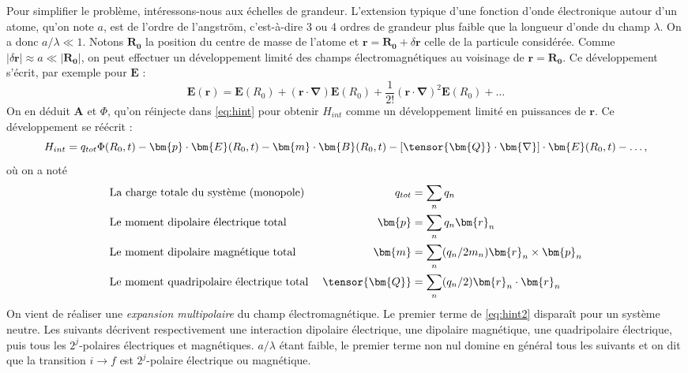 Pour simplifier le problème, intéressons-nous aux échelles de grandeur. L'extension typique d'une fonction d'onde électronique autour d'un atome, qu'on note $a$, est de l'ordre de l'angström, c'est-à-dire 3 ou 4 ordres de grandeur plus faible que la longueur d'onde du champ $\lambda$. On a donc $a/\lambda\ll 1$. Notons $\bm{R_0}$ la position du centre de masse de l'atome et $\bm{r} = \bm{R_0} + \delta \bm{r}$ celle de la particule considérée. Comme $|\delta \bm{r}| \approx a \ll |\bm{R_0}|$, on peut effectuer un développement limité des champs électromagnétiques au voisinage de $\bm{r} = \bm{R_0}$. Ce développement s'écrit, par exemple pour $\bm{E}$ :
\begin{equation}
\bm{E}(\bm{r}) = \bm{E}(R_0)+(\bm{r}\cdot\bm{\nabla})\bm{E}(R_0)+\frac{1}{2!}(\bm{r}\cdot\bm{\nabla})^2\bm{E}(R_0)+\ldots
\label{eq:dvpmt_E}
\end{equation}
On en déduit $\bm{A}$ et $\Phi$, qu'on réinjecte dans \ref{eq:hint} pour obtenir $H_{int}$ comme un développement limité en puissances de $\bm{r}$. Ce développement se réécrit  :
\begin{equation}
H_{int} = q_{tot} \Phi(R_0,t) - \bm{p}\cdot\bm{E}(R_0,t)-\bm{m}\cdot\bm{B}(R_0,t)-[\tensor{\bm{Q}}\cdot\bm{\nabla}]\cdot\bm{E}(R_0,t)-\ldots,
\label{eq:hint2}
\end{equation}
où on a noté
\begin{align*}
&\text{La charge totale du système (monopole) } \; &q_{tot} &= \sum_n q_n\\
&\text{Le moment dipolaire électrique total} \; &\bm{p} &= \sum_n q_n\bm{r}_n\\
&\text{Le moment dipolaire magnétique total} \; &\bm{m} &= \sum_n (q_n/2m_n)\bm{r}_n\times\bm{p}_n\\
&\text{Le moment quadripolaire électrique total} \; &\tensor{\bm{Q}} &= \sum_n (q_n/2)\bm{r}_n\cdot\bm{r}_n\\
\end{align*}
On vient de réaliser une \textit{expansion multipolaire} du champ électromagnétique. Le premier terme de \ref{eq:hint2} disparaît pour un système neutre. Les suivants décrivent respectivement une interaction dipolaire électrique, une dipolaire magnétique, une quadripolaire électrique, puis tous les $2^j$-polaires électriques et magnétiques. $a/\lambda$ étant faible, le premier terme non nul domine en général tous les suivants et on dit que la transition $i\rightarrow f$ est $2^j$-polaire électrique ou magnétique.

